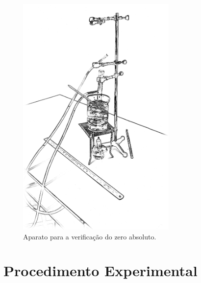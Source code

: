 \begin{figure}[!h]
\centering
\forceversofloat
\includegraphics[width=0.7\textwidth]{Ilustrations/AparatoZeroAbs.png}
\caption{Aparato para a verificação do zero absoluto.}
\end{figure}
\section{Procedimento Experimental}

